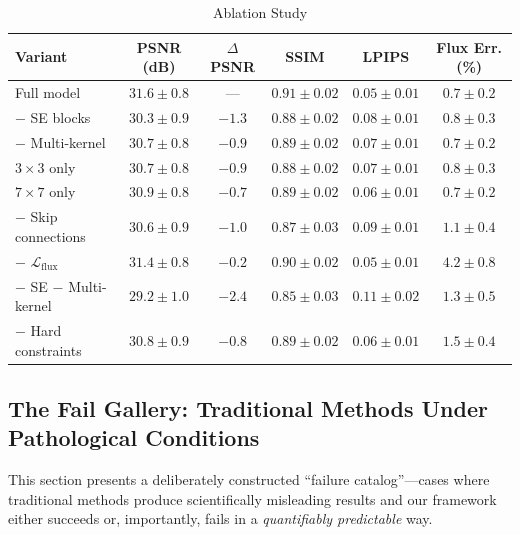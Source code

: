 \documentclass[usenatbib]{mnras}
\newcommand{\tablecomments}[1]{\vspace{4pt}{\footnotesize #1}\vspace{2pt}}
\begin{document}
\begin{table}
\centering
\caption{Ablation Study}\label{tab:ablation}
\begin{tabular}{lccccc}
\toprule
Variant & PSNR (dB) & $\Delta$PSNR & SSIM & LPIPS & Flux Err. (\%) \\
\midrule
Full model & $\mathbf{31.6 \pm 0.8}$ & --- & $\mathbf{0.91 \pm 0.02}$ & $\mathbf{0.05 \pm 0.01}$ & $\mathbf{0.7 \pm 0.2}$ \\
$-$ SE blocks & $30.3 \pm 0.9$ & $-1.3$ & $0.88 \pm 0.02$ & $0.08 \pm 0.01$ & $0.8 \pm 0.3$ \\
$-$ Multi-kernel & $30.7 \pm 0.8$ & $-0.9$ & $0.89 \pm 0.02$ & $0.07 \pm 0.01$ & $0.7 \pm 0.2$ \\
$3\times3$ only & $30.7 \pm 0.8$ & $-0.9$ & $0.88 \pm 0.02$ & $0.07 \pm 0.01$ & $0.8 \pm 0.3$ \\
$7\times7$ only & $30.9 \pm 0.8$ & $-0.7$ & $0.89 \pm 0.02$ & $0.06 \pm 0.01$ & $0.7 \pm 0.2$ \\
$-$ Skip connections & $30.6 \pm 0.9$ & $-1.0$ & $0.87 \pm 0.03$ & $0.09 \pm 0.01$ & $1.1 \pm 0.4$ \\
$-$ $\mathcal{L}_{\text{flux}}$ & $31.4 \pm 0.8$ & $-0.2$ & $0.90 \pm 0.02$ & $0.05 \pm 0.01$ & $4.2 \pm 0.8$ \\
$-$ SE $-$ Multi-kernel & $29.2 \pm 1.0$ & $-2.4$ & $0.85 \pm 0.03$ & $0.11 \pm 0.02$ & $1.3 \pm 0.5$ \\
$-$ Hard constraints & $30.8 \pm 0.9$ & $-0.8$ & $0.89 \pm 0.02$ & $0.06 \pm 0.01$ & $1.5 \pm 0.4$ \\
\bottomrule
\end{tabular}
\tablecomments{1000-image synthetic test set at SNR~$=2$. The final row reports PINN performance without hard constraints (mass + momentum conservation). All $\Delta$PSNR $\geq 0.7$~dB are significant at $p < 0.01$ (paired $t$-test, Holm--Bonferroni correction for 8 comparisons).}
\end{table}


\subsection{The Fail Gallery: Traditional Methods Under Pathological Conditions}\label{sec:fail_gallery}

This section presents a deliberately constructed ``failure catalog''---cases where traditional methods produce scientifically misleading results and our framework either succeeds or, importantly, fails in a \textit{quantifiably predictable} way.
\end{document}
